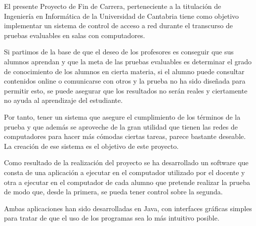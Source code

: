 





El presente Proyecto de Fin de Carrera, perteneciente a la titulación de Ingeniería en Informática de la Universidad de Cantabria tiene como objetivo implementar un sistema de control de acceso a red durante el transcurso de pruebas evaluables en salas con computadores. 
\newline

Si partimos de la base de que el deseo de los profesores es conseguir que sus alumnos aprendan y que la meta de las pruebas evaluables es determinar el grado de conocimiento de los alumnos en cierta materia, si el alumno puede consultar contenidos online o comunicarse con otros y la prueba no ha sido diseñada para permitir esto, se puede asegurar que los resultados no serán reales y ciertamente no ayuda al aprendizaje del estudiante.
\newline

Por tanto, tener un sistema que asegure el cumplimiento de los términos de la prueba y que además se aproveche de la gran utilidad que tienen las redes de computadores para hacer más cómodas ciertas tareas, parece bastante deseable. La creación de ese sistema es el objetivo de este proyecto.
\newline

Como resultado de la realización del proyecto se ha desarrollado un software que consta de una aplicación a ejecutar en el computador utilizado por el docente y otra a ejecutar en el computador de cada alumno que pretende realizar la prueba de modo que, desde la primera, se pueda tener control sobre la segunda.
\newline

Ambas aplicaciones han sido desarrolladas en Java, con interfaces gráficas simples para tratar de que el uso de los programas sea lo más intuitivo posible.




